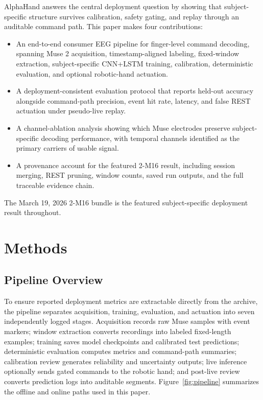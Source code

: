 \documentclass[conference]{IEEEtran}
\begin{document}
AlphaHand answers the central deployment question by showing that subject-specific structure survives calibration, safety gating, and replay through an auditable command path. This paper makes four contributions:
\begin{itemize}
\item An end-to-end consumer EEG pipeline for finger-level command decoding, spanning Muse 2 acquisition, timestamp-aligned labeling, fixed-window extraction, subject-specific CNN+LSTM training, calibration, deterministic evaluation, and optional robotic-hand actuation.
\item A deployment-consistent evaluation protocol that reports held-out accuracy alongside command-path precision, event hit rate, latency, and false REST actuation under pseudo-live replay.
\item A channel-ablation analysis showing which Muse electrodes preserve subject-specific decoding performance, with temporal channels identified as the primary carriers of usable signal.
\item A provenance account for the featured 2-M16 result, including session merging, REST pruning, window counts, saved run outputs, and the full traceable evidence chain.
\end{itemize}
The March 19, 2026 2-M16 bundle is the featured subject-specific deployment result throughout.

\section{Methods}
\subsection{Pipeline Overview}

To ensure reported deployment metrics are extractable directly from the archive, the pipeline separates acquisition, training, evaluation, and actuation into seven independently logged stages. Acquisition records raw Muse samples with event markers; window extraction converts recordings into labeled fixed-length examples; training saves model checkpoints and calibrated test predictions; deterministic evaluation computes metrics and command-path summaries; calibration review generates reliability and uncertainty outputs; live inference optionally sends gated commands to the robotic hand; and post-live review converts prediction logs into auditable segments. Figure~\ref{fig:pipeline} summarizes the offline and online paths used in this paper.
\end{document}
